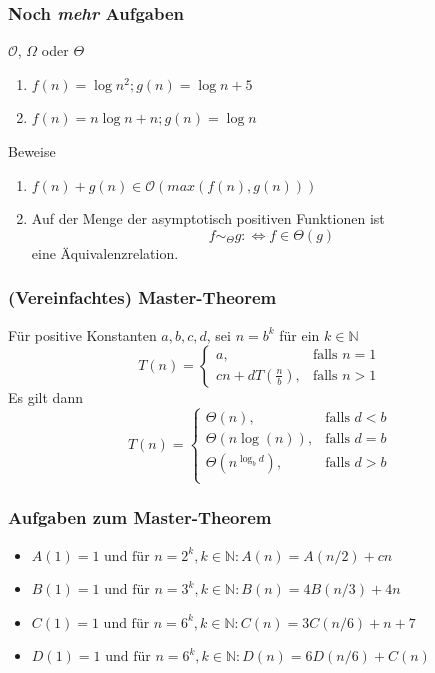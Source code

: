 \begin{frame}
	\frametitle{Noch \emph{mehr} Aufgaben}
	\begin{block}{$\mathcal{O}$, $\Omega$ oder $\Theta$}
		\begin{enumerate}
			\item $f(n) = \log{n^2}; g(n) = \log{n} + 5$
			\item $f(n) = n \log{n} + n; g(n) = \log{n}$
		\end{enumerate}
	\end{block}

	\begin{block}{Beweise}
		\begin{enumerate}
			\item $f(n) + g(n) \in \mathcal{O}(max(f(n), g(n)))$
			\item Auf der Menge der asymptotisch positiven Funktionen ist $$f \sim_\Theta g :\Leftrightarrow f \in \Theta(g)$$ eine Äquivalenzrelation.
		\end{enumerate}
	\end{block}
\end{frame}

\begin{frame}
	\frametitle{(Vereinfachtes) Master-Theorem}
	\begin{center}
		Für positive Konstanten $a, b, c, d$, sei $n = b^k$ für ein $k \in \mathbb{N}$
			$$
				T(n) = \begin{cases}
					a, &\text{falls } n = 1\\
					c n + d T(\frac{n}{b}), &\text{falls } n > 1
				\end{cases}
			$$
		Es gilt dann
			$$
				T(n) = \begin{cases}
					\Theta(n), &\text{falls } d < b\\
					\Theta(n \log(n)), &\text{falls } d = b\\
					\Theta(n^{\log_b{d}}), &\text{falls } d > b\\
				\end{cases}
			$$
	\end{center}
\end{frame}

\begin{frame}
	\frametitle{Aufgaben zum Master-Theorem}
	\begin{itemize}
		\item $A(1) = 1 \text{ und für } n = 2^k, k \in \mathbb{N}: A(n) = A(n/2) + cn$
		\item $B(1) = 1 \text{ und für } n = 3^k, k \in \mathbb{N}: B(n) = 4B(n/3) + 4n$
		\item $C(1) = 1 \text{ und für } n = 6^k, k \in \mathbb{N}: C(n) = 3C(n/6) + n + 7$
		\item $D(1) = 1 \text{ und für } n = 6^k, k \in \mathbb{N}: D(n) = 6D(n/6) + C(n)$
	\end{itemize}
\end{frame}

